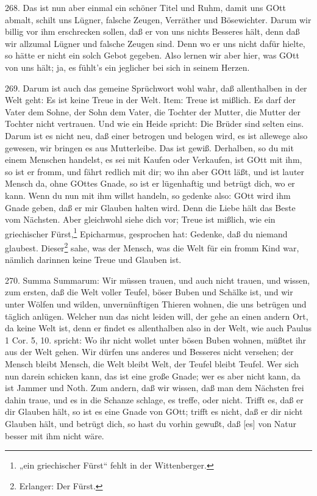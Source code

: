 268. Das ist nun aber einmal ein schöner Titel und Ruhm, damit uns GOtt abmalt, schilt uns Lügner, falsche Zeugen, Verräther und Bösewichter. Darum wir billig vor ihm erschrecken sollen, daß er von uns nichts Besseres hält, denn daß wir allzumal Lügner und falsche Zeugen sind. Denn wo er uns nicht dafür hielte, so hätte er nicht ein solch Gebot gegeben. Also
lernen wir aber hier, was GOtt von uns hält; ja, es fühlt’s ein jeglicher bei sich in seinem Herzen.

269. Darum ist auch das gemeine Sprüchwort wohl wahr, daß allenthalben in der Welt geht: Es ist keine Treue in der Welt. Item: Treue ist mißlich. Es darf der Vater dem Sohne, der Sohn dem Vater, die Tochter der Mutter, die Mutter der Tochter nicht vertrauen. Und wie ein Heide spricht: Die Brüder sind selten eins. Darum ist es nicht neu, daß einer betrogen und belogen wird, es ist allewege also gewesen, wir bringen es aus Mutterleibe. Das ist gewiß. Derhalben, so du mit einem Menschen handelst, es sei mit Kaufen oder Verkaufen, ist GOtt mit ihm, so ist er fromm, und fährt redlich mit dir; wo ihn aber GOtt läßt, und ist lauter Mensch da, ohne GOttes Gnade, so ist er lügenhaftig und betrügt dich, wo er kann. Wenn du nun mit ihm willst handeln, so gedenke also: GOtt wird ihm Gnade geben, daß er mir Glauben halten wird. Denn die Liebe hält das Beste vom Nächsten. Aber gleichwohl siehe dich vor; Treue ist mißlich, wie ein griechischer Fürst,\footnote{„ein griechischer Fürst“ fehlt in der Wittenberger.} Epicharmus, gesprochen hat: Gedenke, daß du niemand glaubest. Dieser\footnote{Erlanger: Der Fürst.} sahe, was der Mensch, was die Welt für ein fromm Kind war, nämlich darinnen keine Treue und Glauben ist.

270. Summa Summarum: Wir müssen trauen, und auch nicht trauen, und wissen, zum ersten, daß die Welt voller Teufel, böser Buben und Schälke ist, und wir unter Wölfen und wilden, unvernünftigen Thieren wohnen, die uns betrügen und täglich anlügen. Welcher nun das nicht leiden will, der gehe an einen andern Ort, da keine Welt ist, denn er findet es allenthalben also in der Welt, wie auch Paulus 1 Cor. 5, 10. spricht: Wo ihr nicht wollet unter bösen Buben wohnen, müßtet ihr aus der Welt gehen. Wir dürfen uns anderes und Besseres nicht versehen; der Mensch bleibt Mensch, die Welt bleibt Welt, der Teufel bleibt Teufel. Wer sich nun darein schicken kann, das ist eine große Gnade; wer es aber nicht kann, da ist Jammer und Noth. Zum andern, daß wir wissen, daß man dem Nächsten frei dahin traue, und es in die Schanze schlage, es treffe, oder nicht. Trifft es, daß er dir Glauben hält, so ist es eine Gnade von GOtt; trifft es nicht, daß er dir nicht Glauben hält, und betrügt dich, so hast du vorhin gewußt, daß [es] von Natur besser mit ihm nicht wäre.

